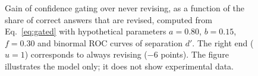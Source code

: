 \begin{figure}[t]
\caption{Gain of confidence gating over never revising, as a function of the share of correct answers that are revised, computed from Eq.~\eqref{eq:gated} with hypothetical parameters $a=0.80$, $b=0.15$, $f=0.30$ and binormal ROC curves of separation $d'$. The right end ($u=1$) corresponds to always revising ($-6$ points). The figure illustrates the model only; it does not show experimental data.}
\label{fig:theory}
\end{figure}
